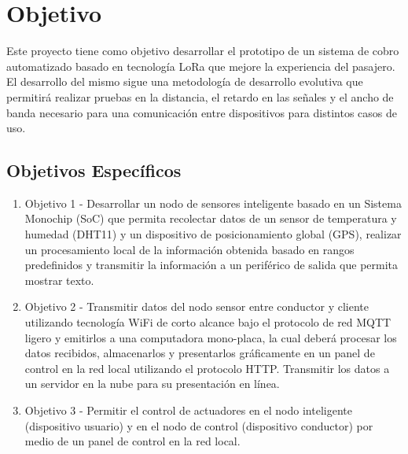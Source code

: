 \documentclass[10pt]{article}
\begin{document}
\section{Objetivo}
Este proyecto tiene como objetivo desarrollar el prototipo de un sistema de cobro automatizado basado en tecnología LoRa que mejore la experiencia del pasajero. El desarrollo del mismo sigue una metodología de desarrollo evolutiva que permitirá realizar pruebas en la distancia, el retardo en las señales y el ancho de banda necesario para una comunicación entre dispositivos para distintos casos de uso.


\subsection{Objetivos Específicos}

\begin{enumerate}


\item Objetivo 1 - Desarrollar un nodo de sensores inteligente basado en un Sistema Monochip (SoC) que permita recolectar datos de un sensor de temperatura y humedad (DHT11) y un dispositivo de posicionamiento global (GPS), realizar un procesamiento local de la información obtenida basado en rangos predefinidos y transmitir la información a un periférico de salida que permita mostrar texto. 

\item Objetivo 2 - Transmitir datos del nodo sensor entre conductor y cliente utilizando tecnología WiFi de corto alcance bajo el protocolo de red MQTT ligero y emitirlos a una computadora mono-placa, la cual deberá procesar los datos recibidos, almacenarlos y presentarlos gráficamente en un panel de control en la red local utilizando el protocolo HTTP. Transmitir los datos a un servidor en la nube para su presentación en línea.

\item Objetivo 3 - Permitir el control de actuadores en el nodo inteligente (dispositivo usuario) y en el nodo de control (dispositivo conductor) por medio de un panel de control en la red local. 
\end{enumerate}
\end{document}
